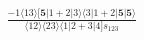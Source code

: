 \documentclass[varwidth, border=5pt]{standalone}
\begin{document}
\begin{my}
$\begin{gathered}
\scriptscriptstyle\frac{-1⟨13⟩[𝟓|1+2|3⟩⟨3|1+2|𝟓|𝟓⟩}{⟨12⟩⟨23⟩⟨1|2+3|4]s_{123}}
\end{gathered}$
\end{my}
\end{document}

